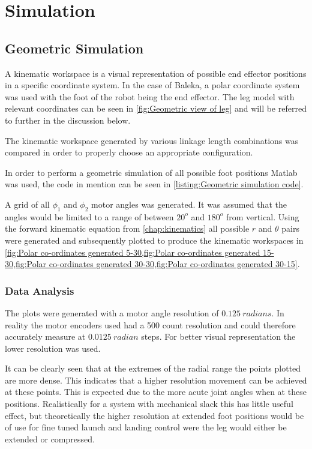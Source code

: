 \chapter{Simulation}
\section{Geometric Simulation}

A kinematic workspace is a visual representation of possible end effector positions in a specific coordinate system. In the case of Baleka, a polar coordinate system was used with the foot of the robot being the end effector. The leg model with relevant coordinates can be seen in \cref{fig:Geometric view of leg} and will be referred to further in the discussion below.

The kinematic workspace generated by various linkage length combinations was compared in order to properly choose an appropriate configuration. 

In order to perform a geometric simulation of all possible foot positions Matlab was used, the code in mention can be seen in \cref{listing:Geometric simulation code}. 

A grid of all $\phi_1$ and $\phi_2$ motor angles was generated. It was assumed that the angles would be limited to a range of between $20^o$ and $180^o$ from vertical. Using the forward kinematic equation from \cref{chap:kinematics} all possible $r$ and $\theta$ pairs were generated and subsequently plotted to produce the kinematic workspaces in \cref{fig:Polar co-ordinates generated 5-30,fig:Polar co-ordinates generated 15-30,fig:Polar co-ordinates generated 30-30,fig:Polar co-ordinates generated 30-15}.

\subsection{Data Analysis}
The plots were generated with a motor angle resolution of $0.125\ radians$. In reality the motor encoders used had a 500 count resolution and could therefore accurately measure at $0.0125\ radian$ steps. For better visual representation the lower resolution was used. 

It can be clearly seen that at the extremes of the radial range the points plotted are more dense. This indicates that a higher resolution movement can be achieved at these points. This is expected due to the more acute joint angles when at these positions. Realistically for a system with mechanical slack this has little useful effect, but theoretically the higher resolution at extended foot positions would be of use for fine tuned launch and landing control were the leg would either be extended or compressed. 

